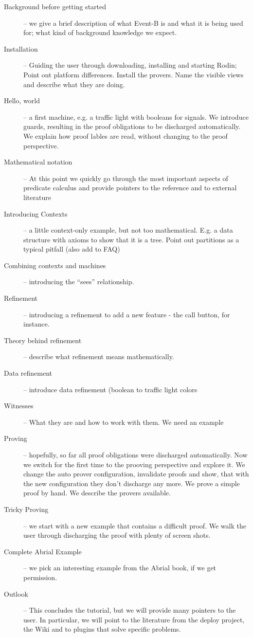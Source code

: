 \begin{description}
	\item[Background before getting started] -- we give a brief description of what Event-B is and what it is being used for; what kind of background knowledge we expect.
	\item[Installation] -- Guiding the user through downloading, installing and starting Rodin; Point out platform differences.  Install the provers.  Name the visible views and describe what they are doing.
	\item[Hello, world] -- a first machine, e.g. a traffic light with booleans for signals.  We introduce guards, resulting in the proof obligations to be discharged automatically. We explain how proof lables are read, without changing to the proof perspective.
	\item[Mathematical notation] -- At this point we quickly go through the most important aspects of predicate calculus and provide pointers to the reference and to external literature
	\item[Introducing Contexts] -- a little context-only example, but not too mathematical.  E.g. a data structure with axioms to show that it is a tree. Point out partitions as a typical pitfall (also add to FAQ)
	\item[Combining contexts and machines] -- introducing the ``sees'' relationship.
	\item[Refinement] -- introducing a refinement to add a new feature - the call button, for instance.
	\item[Theory behind refinement] -- describe what refinement means mathematically.
	\item[Data refinement] -- introduce data refinement (boolean to traffic light colors
	\item[Witnesses] -- What they are and how to work with them.  We need an example
	\item[Proving] -- hopefully, so far all proof obligations were discharged automatically.  Now we switch for the first time to the prooving perspective and explore it.  We change the auto prover configuration, invalidate proofs and show, that with the new configuration they don't discharge any more.  We prove a simple proof by hand.  We describe the provers available.
	\item[Tricky Proving] -- we start with a new example that contains a difficult proof.  We walk the user through discharging the proof with plenty of screen shots.
	\item[Complete Abrial Example] -- we pick an interesting example from the Abrial book, if we get permission.
	\item[Outlook] -- This concludes the tutorial, but we will provide many pointers to the user.  In particular, we will point to the literature from the deploy project, the Wiki and to plugins that solve specific problems.
\end{description}




